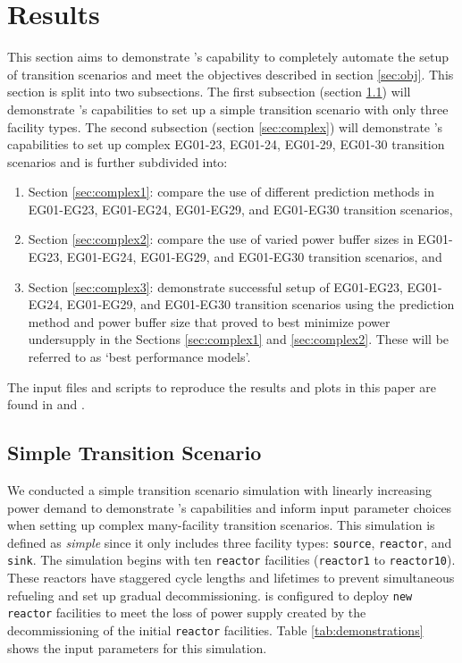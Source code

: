 \section{Results}
This section aims to demonstrate \deploy's capability to completely automate the setup of 
transition scenarios and meet the objectives described in section 
\ref{sec:obj}. 
This section is split into two subsections. 
The first subsection (section \ref{sec:demo}) will demonstrate \deploy's capabilities 
to set up a simple transition scenario with only three facility types. 
The second subsection (section \ref{sec:complex}) will demonstrate \deploy's capabilities to
set up complex EG01-23, EG01-24, EG01-29, EG01-30 transition scenarios and is further 
subdivided into:  
\begin{enumerate}
\item Section \ref{sec:complex1}: compare the use of different \deploy prediction methods in EG01-EG23, EG01-EG24, 
EG01-EG29, and EG01-EG30 transition scenarios, 
\item Section \ref{sec:complex2}: compare the use of varied power buffer sizes in EG01-EG23, EG01-EG24, 
EG01-EG29, and EG01-EG30 transition scenarios, and
\item Section \ref{sec:complex3}: demonstrate successful \deploy setup of EG01-EG23, EG01-EG24, 
EG01-EG29, and EG01-EG30 transition scenarios using the prediction method and 
power buffer size that proved to best minimize power undersupply in the Sections 
\ref{sec:complex1} and \ref{sec:complex2}. 
These will be referred to as `best performance models'. 
\end{enumerate}
The input files and scripts to reproduce the results and plots in this
paper are found in \cite{chee_arfc/d3ploy:_2019} and 
\cite{bae_arfctransition-scenarios_2019}. 

\subsection{Simple Transition Scenario}
\label{sec:demo}
We conducted a simple transition scenario simulation with
linearly increasing power demand
to demonstrate \deploy's capabilities and inform input parameter 
choices when setting up complex many-facility transition scenarios. 
This simulation is defined as \textit{simple} since 
it only includes
three facility types: \texttt{source}, \texttt{reactor}, and 
\texttt{sink}. 
The simulation begins with ten \texttt{reactor} facilities 
(\texttt{reactor1} to \texttt{reactor10}). 
These reactors have staggered cycle lengths and lifetimes to prevent 
simultaneous refueling and set up gradual decommissioning. 
\deploy is configured to deploy \texttt{new reactor} facilities
to meet the loss of power supply created by the decommissioning 
of the initial \texttt{reactor} facilities. 
Table \ref{tab:demonstrations} shows the \deploy input parameters 
for this simulation.  

